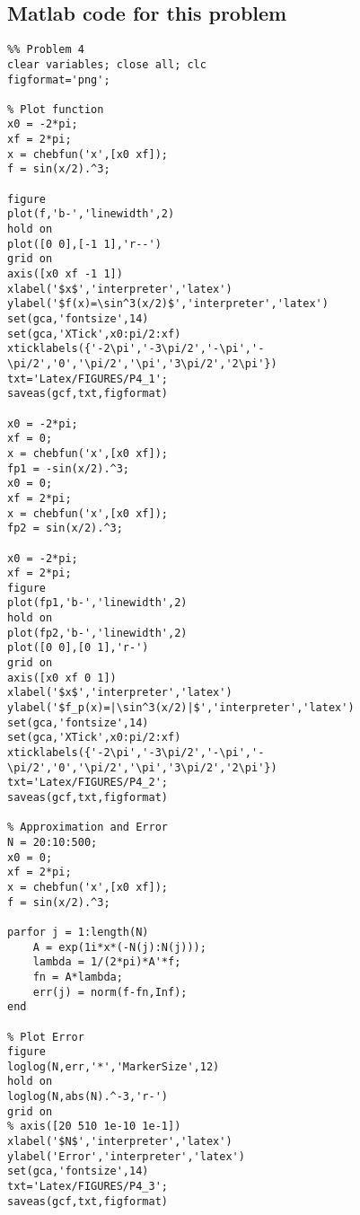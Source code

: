 \subsection*{Matlab code for this problem}
\begin{verbatim}
%% Problem 4
clear variables; close all; clc
figformat='png';

% Plot function
x0 = -2*pi;
xf = 2*pi;
x = chebfun('x',[x0 xf]);
f = sin(x/2).^3;

figure
plot(f,'b-','linewidth',2)
hold on
plot([0 0],[-1 1],'r--')
grid on
axis([x0 xf -1 1])
xlabel('$x$','interpreter','latex')
ylabel('$f(x)=\sin^3(x/2)$','interpreter','latex')
set(gca,'fontsize',14)
set(gca,'XTick',x0:pi/2:xf) 
xticklabels({'-2\pi','-3\pi/2','-\pi','-\pi/2','0','\pi/2','\pi','3\pi/2','2\pi'})
txt='Latex/FIGURES/P4_1';
saveas(gcf,txt,figformat)

x0 = -2*pi;
xf = 0;
x = chebfun('x',[x0 xf]);
fp1 = -sin(x/2).^3;
x0 = 0;
xf = 2*pi;
x = chebfun('x',[x0 xf]);
fp2 = sin(x/2).^3;

x0 = -2*pi;
xf = 2*pi;
figure
plot(fp1,'b-','linewidth',2)
hold on
plot(fp2,'b-','linewidth',2)
plot([0 0],[0 1],'r-')
grid on
axis([x0 xf 0 1])
xlabel('$x$','interpreter','latex')
ylabel('$f_p(x)=|\sin^3(x/2)|$','interpreter','latex')
set(gca,'fontsize',14)
set(gca,'XTick',x0:pi/2:xf) 
xticklabels({'-2\pi','-3\pi/2','-\pi','-\pi/2','0','\pi/2','\pi','3\pi/2','2\pi'})
txt='Latex/FIGURES/P4_2';
saveas(gcf,txt,figformat)

% Approximation and Error
N = 20:10:500;
x0 = 0;
xf = 2*pi;
x = chebfun('x',[x0 xf]);
f = sin(x/2).^3;

parfor j = 1:length(N)
    A = exp(1i*x*(-N(j):N(j)));
    lambda = 1/(2*pi)*A'*f;
    fn = A*lambda;
    err(j) = norm(f-fn,Inf);
end

% Plot Error
figure
loglog(N,err,'*','MarkerSize',12)
hold on
loglog(N,abs(N).^-3,'r-')
grid on
% axis([20 510 1e-10 1e-1])
xlabel('$N$','interpreter','latex')
ylabel('Error','interpreter','latex')
set(gca,'fontsize',14)
txt='Latex/FIGURES/P4_3';
saveas(gcf,txt,figformat)
\end{verbatim}